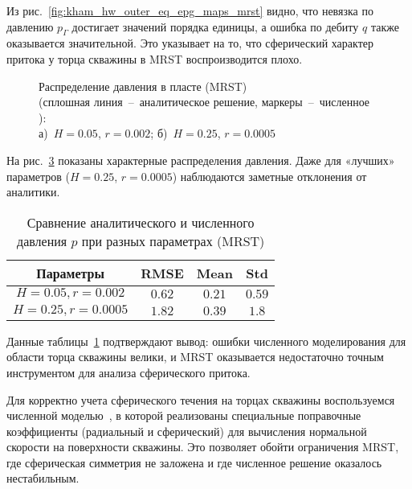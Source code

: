 \documentclass{article}
\begin{document}
Из рис.~\ref{fig:kham_hw_outer_eq_epg_maps_mrst} видно, что невязка по давлению
$p_{\Gamma}$ достигает значений порядка единицы,
а ошибка по дебиту $q$ также оказывается значительной.
Это указывает на то, что сферический характер притока у торца скважины в MRST воспроизводится плохо.

\begin{figure}[!ht]
\centering
\begin{subfigure}{0.48\textwidth}
\centering

\caption{}
\label{fig:kham_hw_outer_p_worst_pg_mrst}
\end{subfigure}
\hfill
\begin{subfigure}{0.48\textwidth}
\centering

\caption{}
\label{fig:kham_hw_outer_p_best_pg_mrst}
\end{subfigure}
\caption{
Распределение давления в пласте (MRST) \\
(сплошная линия~--~аналитическое решение, маркеры~--~численное ): \\
а)~$H = 0.05$, $r = 0.002$;
б)~$H = 0.25$, $r = 0.0005$
}
\label{fig:kham_hw_outer_press_disrt}
\end{figure}

На рис.~\ref{fig:kham_hw_outer_press_disrt} показаны характерные распределения давления. Даже для «лучших» параметров ($H=0.25$, $r=0.0005$) наблюдаются заметные отклонения от аналитики.

\begin{table}[h!]
\centering
\caption{Сравнение аналитического и численного давления $p$ при разных параметрах (MRST)}
\label{tab:kham_hw_outer_p_error_metrics_mrst}
\begin{tabular}{|c|c|c|c|}
\hline
\textbf{Параметры} & \textbf{RMSE} & \textbf{Mean} & \textbf{Std} \\
\hline
$H=0.05, r=0.002$ & $0.62$ & $0.21$ & $0.59$ \\
\hline
$H=0.25, r=0.0005$ & $1.82$ & $0.39$ & $1.8$ \\
\hline
\end{tabular}
\end{table}

Данные таблицы~\ref{tab:kham_hw_outer_p_error_metrics_mrst} подтверждают вывод:
ошибки численного моделирования для области торца скважины велики,
и MRST оказывается недостаточно точным инструментом для анализа сферического притока.

Для корректно учета сферического течения на торцах скважины воспользуемся
численной моделью~\cite{lit:kham_mazo_uzku_2015}, в которой реализованы
специальные поправочные коэффициенты (радиальный и сферический) для вычисления нормальной скорости на поверхности скважины. Это позволяет обойти ограничения MRST, где сферическая симметрия не заложена и где численное решение оказалось нестабильным.
\end{document}
